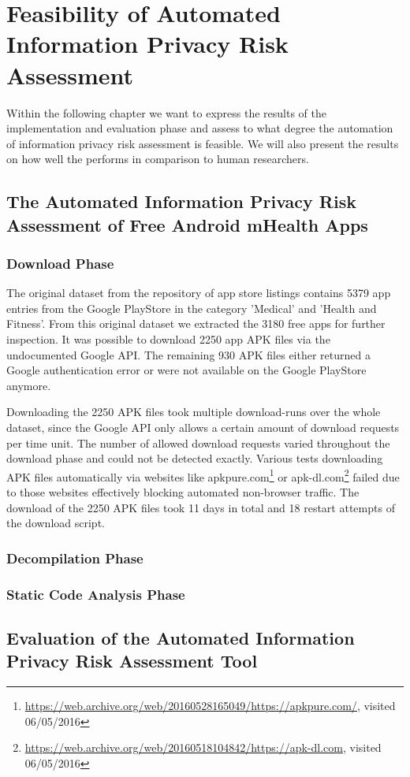 \section{Feasibility of Automated Information Privacy Risk Assessment}

Within the following chapter we want to express the results of the implementation and evaluation phase and assess to what degree the automation of information privacy risk assessment is feasible.
We will also present the results on how well the \aiprat performs in comparison to human researchers.

\subsection{The Automated Information Privacy Risk Assessment of Free Android mHealth Apps}

\subsubsection{Download Phase}

The original dataset from the \cite{Xu2015} repository of app store listings contains 5379 app entries from the Google PlayStore in the category 'Medical' and 'Health and Fitness'.
From this original dataset we extracted the 3180 free apps for further inspection.
It was possible to download 2250 app APK files via the undocumented Google API.
The remaining 930 APK files either returned a Google authentication error or were not available on the Google PlayStore anymore.

Downloading the 2250 APK files took multiple download-runs over the whole dataset, since the Google API only allows a certain amount of download requests per time unit.
The number of allowed download requests varied throughout the download phase and could not be detected exactly.
Various tests downloading APK files automatically via websites like apkpure.com\footnote{\url{https://web.archive.org/web/20160528165049/https://apkpure.com/}, visited 06/05/2016} or apk-dl.com\footnote{\url{https://web.archive.org/web/20160518104842/https://apk-dl.com}, visited 06/05/2016} failed due to those websites effectively blocking automated non-browser traffic.
The download of the 2250 APK files took 11 days in total and 18 restart attempts of the download script.

\subsubsection{Decompilation Phase}


\subsubsection{Static Code Analysis Phase}


\subsection{Evaluation of the Automated Information Privacy Risk Assessment Tool}
